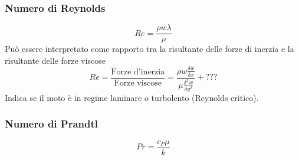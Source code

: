 \subsubsection{Numero di Reynolds}
\[
    Re = \frac{\rho w \lambda}{\mu}
\]
Può essere interpretato come rapporto tra la risultante
delle forze di inerzia e la risultante delle forze viscose
\[
    Re = \frac{\text{Forze d'inerzia}}{\text{Forze viscose}} = \frac{\rho w \frac{\delta w}{\delta x}}{\mu \frac{\delta ^2 w}{\delta y^2}} + ???
\]
Indica se il moto è in regime laminare o turbolento (Reynolds critico).
\subsubsection{Numero di Prandtl}
\[
    Pr = \frac{c_P \mu}{k}
\]